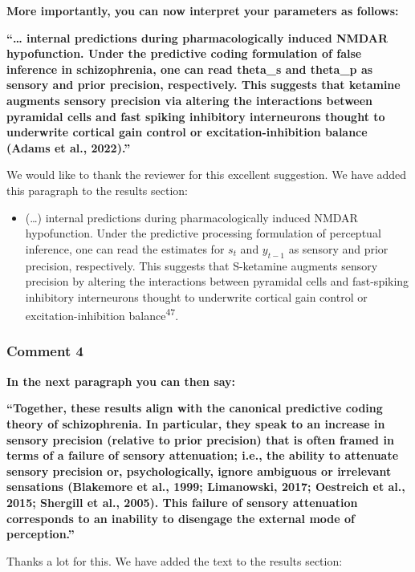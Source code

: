 \documentclass[
]{article}
\providecommand{\tightlist}{%
  \setlength{\itemsep}{0pt}\setlength{\parskip}{0pt}}
\begin{document}
\textbf{More importantly, you can now interpret your parameters as
follows:}

\textbf{``\ldots{} internal predictions during pharmacologically induced
NMDAR hypofunction. Under the predictive coding formulation of false
inference in schizophrenia, one can read theta\_s and theta\_p as
sensory and prior precision, respectively. This suggests that ketamine
augments sensory precision via altering the interactions between
pyramidal cells and fast spiking inhibitory interneurons thought to
underwrite cortical gain control or excitation-inhibition balance (Adams
et al., 2022).''}

We would like to thank the reviewer for this excellent suggestion. We
have added this paragraph to the results section:

\begin{itemize}
\tightlist
\item
  (\ldots) internal predictions during pharmacologically induced NMDAR
  hypofunction. Under the predictive processing formulation of
  perceptual inference, one can read the estimates for \(s_t\) and
  \(y_{t-1}\) as sensory and prior precision, respectively. This
  suggests that S-ketamine augments sensory precision by altering the
  interactions between pyramidal cells and fast-spiking inhibitory
  interneurons thought to underwrite cortical gain control or
  excitation-inhibition balance\textsuperscript{47}.
\end{itemize}

\subsubsection{Comment 4}\label{comment-4}

\textbf{In the next paragraph you can then say:}

\textbf{``Together, these results align with the canonical predictive
coding theory of schizophrenia. In particular, they speak to an increase
in sensory precision (relative to prior precision) that is often framed
in terms of a failure of sensory attenuation; i.e., the ability to
attenuate sensory precision or, psychologically, ignore ambiguous or
irrelevant sensations (Blakemore et al., 1999; Limanowski, 2017;
Oestreich et al., 2015; Shergill et al., 2005). This failure of sensory
attenuation corresponds to an inability to disengage the external mode
of perception.''}

Thanks a lot for this. We have added the text to the results section:
\end{document}
